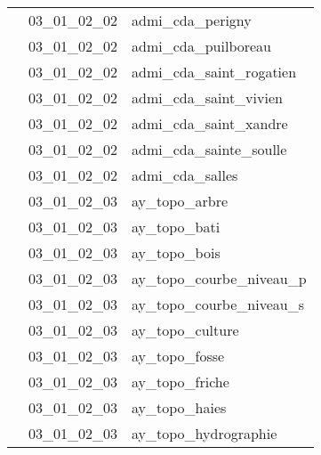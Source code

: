 \documentclass[12pt,titlepage,oneside]{book}
\begin{document}
\begin{supertabular}{|p{10cm}|c|p{15cm}|}
                    & 03\_01\_02\_02 & admi\_cda\_perigny\\


                    & 03\_01\_02\_02 & admi\_cda\_puilboreau\\


                    & 03\_01\_02\_02 & admi\_cda\_saint\_rogatien\\


                    & 03\_01\_02\_02 & admi\_cda\_saint\_vivien\\


                    & 03\_01\_02\_02 & admi\_cda\_saint\_xandre\\


                    & 03\_01\_02\_02 & admi\_cda\_sainte\_soulle\\


                    & 03\_01\_02\_02 & admi\_cda\_salles\\


                    & 03\_01\_02\_03 & ay\_topo\_arbre\\


                    & 03\_01\_02\_03 & ay\_topo\_bati\\


                    & 03\_01\_02\_03 & ay\_topo\_bois\\


                    & 03\_01\_02\_03 & ay\_topo\_courbe\_niveau\_p\\


                    & 03\_01\_02\_03 & ay\_topo\_courbe\_niveau\_s\\


                    & 03\_01\_02\_03 & ay\_topo\_culture\\


                    & 03\_01\_02\_03 & ay\_topo\_fosse\\


                    & 03\_01\_02\_03 & ay\_topo\_friche\\


                    & 03\_01\_02\_03 & ay\_topo\_haies\\


                    & 03\_01\_02\_03 & ay\_topo\_hydrographie\\



\end{supertabular}
\end{document}
